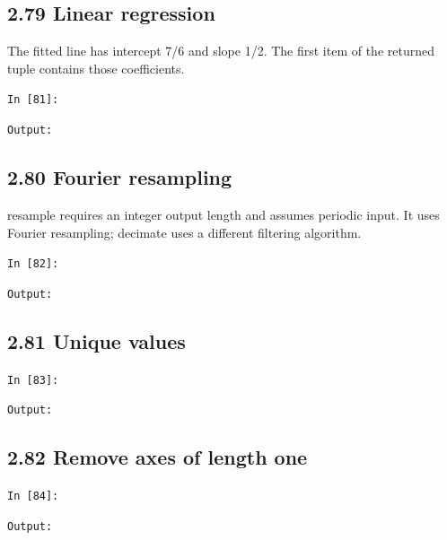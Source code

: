 \documentclass[11pt]{article}
\begin{document}
\par\medskip\noindent\begin{minipage}{\linewidth}
\subsection*{2.79 Linear regression}
The fitted line has intercept 7/6 and slope 1/2. The first item of the returned tuple contains those coefficients.

\noindent\texttt{In [81]:}

\noindent\texttt{Output:}

\end{minipage}\par

\par\medskip\noindent\begin{minipage}{\linewidth}
\subsection*{2.80 Fourier resampling}
resample requires an integer output length and assumes periodic input. It uses Fourier resampling; decimate uses a different filtering algorithm.

\noindent\texttt{In [82]:}

\noindent\texttt{Output:}

\end{minipage}\par

\par\medskip\noindent\begin{minipage}{\linewidth}
\subsection*{2.81 Unique values}
\noindent\texttt{In [83]:}

\noindent\texttt{Output:}

\end{minipage}\par

\par\medskip\noindent\begin{minipage}{\linewidth}
\subsection*{2.82 Remove axes of length one}
\noindent\texttt{In [84]:}

\noindent\texttt{Output:}

\end{minipage}\par
\clearpage
\end{document}
